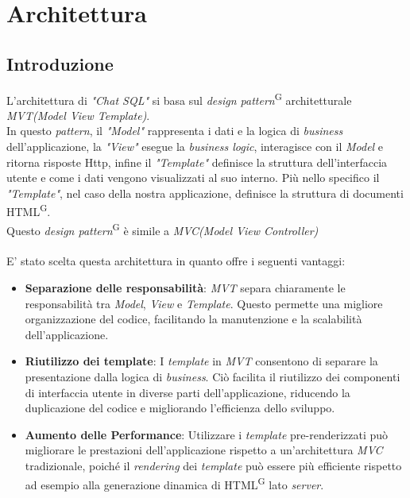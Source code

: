 \documentclass[5pt]{article}
\begin{document}
	\section{Architettura}
	
	\subsection{Introduzione}
L'architettura di \textit{"Chat SQL"} si basa sul \textit{design pattern}\textsuperscript{G} architetturale \textit{MVT(Model View Template)}.\\

In questo \textit{pattern}, il \textit{"Model"} rappresenta i dati e la logica di \textit{business} dell'applicazione, la \textit{"View"} esegue la \textit{business logic}, interagisce con il \textit{Model} e ritorna risposte Http, infine  il \textit{"Template"} definisce la struttura dell'interfaccia utente e come i dati vengono visualizzati al suo interno. Più nello specifico il \textit{"Template"}, nel caso della nostra applicazione, definisce la struttura di documenti HTML\textsuperscript{G}.\\

Questo \textit{design pattern}\textsuperscript{G} è simile a \textit{MVC(Model View Controller)} \\\\
E' stato scelta questa architettura in quanto offre i seguenti vantaggi:
\begin{itemize}
    \item \textbf{Separazione delle responsabilità}: \textit{MVT} separa chiaramente le responsabilità tra \textit{Model}, \textit{View} e \textit{Template}. Questo permette una migliore organizzazione del codice, facilitando la manutenzione e la scalabilità dell'applicazione.

    \item \textbf{Riutilizzo dei template}: I \textit{template} in \textit{MVT} consentono di separare la presentazione dalla logica di \textit{business}. Ciò facilita il riutilizzo dei componenti di interfaccia utente in diverse parti dell'applicazione, riducendo la duplicazione del codice e migliorando l'efficienza dello sviluppo.

    \item \textbf{Aumento delle Performance}: Utilizzare i \textit{template} pre-renderizzati può migliorare le prestazioni dell'applicazione rispetto a un'architettura \textit{MVC} tradizionale, poiché il \textit{rendering} dei \textit{template} può essere più efficiente rispetto ad esempio alla generazione dinamica di HTML\textsuperscript{G} lato \textit{server}.

\end{itemize}
	
\end{document}
